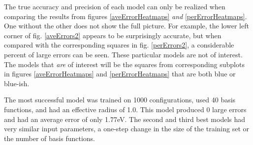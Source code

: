\par The true accuracy and precision of each model can only be realized when comparing the results from figures \ref{aveErrorHeatmaps} \textit{and} \ref{perErrorHeatmaps}. One without the other does not show the full picture. For example, the lower left corner of fig. \ref{aveErrors2} appears to be surprisingly accurate, but when compared with the corresponding squares in fig. \ref{perErrors2}, a considerable percent of large errors can be seen. These particular models are not of interest. The models that \textit{are} of interest will be the squares from corresponding subplots in figures \ref{aveErrorHeatmaps} and \ref{perErrorHeatmaps} that are both blue or blue-ish. 
\par The most successful model was trained on 1000 configurations, used 40 basis functions, and had an effective radius of 1.0. This model produced 0 large errors and had an average error of only 1.77eV. The second and third best models had very similar input parameters, a one-step change in the size of the training set or the number of basis functions.
